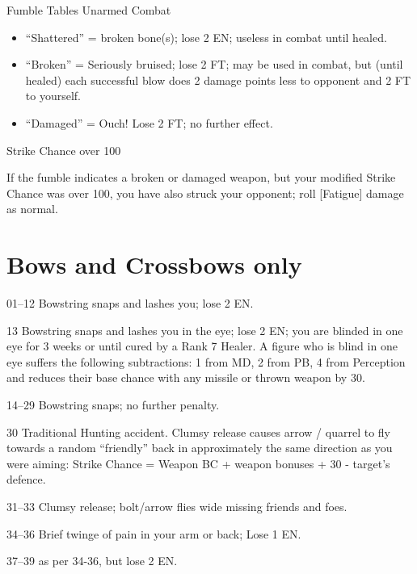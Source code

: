 \begin{Chapter}{Fumble Tables}
Unarmed Combat  

\begin{itemize}
\item  “Shattered” = broken bone(s); lose 2 EN; useless in combat until healed.  
\item  “Broken” = Seriously bruised; lose 2 FT; may be used  in  combat,  but  (until  healed)  each  successful 
blow does 2 damage points less to opponent and 2 FT to yourself.  
\item  “Damaged”  =  Ouch!  Lose  2  FT;  no  further  effect. 
\end{itemize}

Strike Chance over 100 

If the fumble indicates a broken or damaged weapon, but your modified
Strike Chance was over 100, you have also struck your opponent; roll
[Fatigue] damage as normal.

\section{Bows and Crossbows only}

\begin{Description}

\item[01–12] Bowstring snaps and lashes you; lose 2 EN.

\item[13] Bowstring snaps and lashes you in the eye; lose 2 EN; you
  are blinded in one eye for 3 weeks or until cured by a Rank 7
  Healer. A figure who is blind in one eye suffers the following
  subtractions: 1 from MD, 2 from PB, 4 from Perception and reduces
  their base chance with any missile or thrown weapon by 30.

\item[14–29] Bowstring snaps; no further penalty.

\item[30] Traditional Hunting accident. Clumsy release causes arrow /
  quarrel to fly towards a random “friendly” back in approximately the
  same direction as you were aiming: Strike Chance = Weapon BC +
  weapon bonuses + 30 - target’s defence.

\item[31–33]  Clumsy release; bolt/arrow flies wide missing friends and foes. 

\item[34–36] Brief twinge of pain in your arm or back; Lose 1 EN.

\item[37–39] as per 34-36, but lose 2 EN.


\end{Description}
\end{Chapter}
